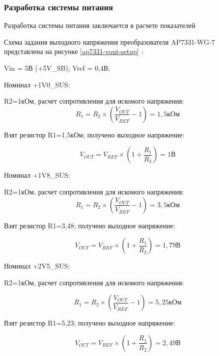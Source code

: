 \subsubsection{Разработка системы питания}\label{powersys}
Разработка системы питания заключается в расчете показателей  

Схема задания выходного напряжения преобразователя AP7331-WG-7 представлена на рисунке \ref{ap7331-vout-setup} \cite{ap7331-c}:

Vin = 5В (+5V\_SB); Vref = 0,4В;

Номинал +1V0\_SUS: 

R2=1кОм, расчет сопротивления для искомого напряжения:
\begin{equation}
R_{1} = R_{2} \times \left(\frac{V_{OUT}}{V_{REF}} - 1 \right) = 1,5\text{кОм}
\end{equation}

Взят резистор R1=1,5кОм; получено выходное напряжение:

\begin{equation}
V_{OUT} = V_{REF} \times \left(1 + \frac{R_{1}}{R_{2}} \right) = 1\text{В}
\end{equation}

Номинал +1V8\_SUS:

R2=1кОм, расчет сопротивления для искомого напряжения:
\begin{equation}
R_{1} = R_{2} \times \left(\frac{V_{OUT}}{V_{REF}} - 1 \right) = 3,5\text{кОм}
\end{equation}

Взят резистор R1=3,48; получено выходное напряжение:

\begin{equation}
V_{OUT} = V_{REF} \times \left(1 + \frac{R_{1}}{R_{2}} \right) = 1,79\text{В}
\end{equation}

Номинал +2V5\_SUS:

R2=1кОм, расчет сопротивления для искомого напряжения:

\begin{equation}
R_{1} = R_{2} \times \left(\frac{V_{OUT}}{V_{REF}} - 1 \right) = 5,25\text{кОм}
\end{equation}

Взят резистор R1=5,23; получено выходное напряжение:

\begin{equation}
V_{OUT} = V_{REF} \times \left(1 + \frac{R_{1}}{R_{2}} \right) = 2,49\text{В}
\end{equation}


